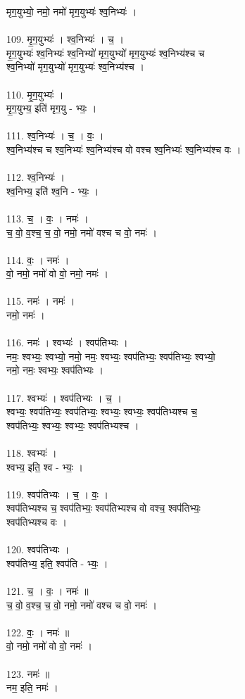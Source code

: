 मृग॒युभ्यो॒ नमो॒ नमो॑ मृग॒युभ्यः॑ श्व॒निभ्यः॑ ।\\
\\
109. मृ॒ग॒युभ्यः॑ । श्व॒निभ्यः॑ । च॒ ।\\
मृ॒ग॒युभ्यः॑ श्व॒निभ्यः॑ श्व॒निभ्यो॑ मृग॒युभ्यो॑ मृग॒युभ्यः॑ श्व॒निभ्य॑श्च च\\
श्व॒निभ्यो॑ मृग॒युभ्यो॑ मृग॒युभ्यः॑ श्व॒निभ्य॑श्च ।\\
\\
110. मृ॒ग॒युभ्यः॑ ।\\
मृ॒ग॒युभ्य॒ इति॑ मृग॒यु - भ्यः॒ ।\\
\\
111. श्व॒निभ्यः॑ । च॒ । वः॒ ।\\
श्व॒निभ्य॑श्च च श्व॒निभ्यः॑ श्व॒निभ्य॑श्च वो वश्च श्व॒निभ्यः॑ श्व॒निभ्य॑श्च वः ।\\
\\
112. श्व॒निभ्यः॑ ।\\
श्व॒निभ्य॒ इति॑ श्व॒नि - भ्यः॒ ।\\
\\
113. च॒ । वः॒ । नमः॑ ।\\
च॒ वो॒ व॒श्च॒ च॒ वो॒ नमो॒ नमो॑ वश्च च वो॒ नमः॑ ।\\
\\
114. वः॒ । नमः॑ ।\\
वो॒ नमो॒ नमो॑ वो वो॒ नमो॒ नमः॑ ।\\
\\
115. नमः॑ । नमः॑ ।\\
नमो॒ नमः॑ ।\\
\\
116. नमः॑ । श्वभ्यः॑ । श्वप॑तिभ्यः ।\\
नमः॒ श्वभ्यः॒ श्वभ्यो॒ नमो॒ नमः॒ श्वभ्यः॒ श्वप॑तिभ्यः॒ श्वप॑तिभ्यः॒ श्वभ्यो॒\\
नमो॒ नमः॒ श्वभ्यः॒ श्वप॑तिभ्यः ।\\
\\
117. श्वभ्यः॑ । श्वप॑तिभ्यः । च॒ ।\\
श्वभ्यः॒ श्वप॑तिभ्यः॒ श्वप॑तिभ्यः॒ श्वभ्यः॒ श्वभ्यः॒ श्वप॑तिभ्यश्च च॒\\
श्वप॑तिभ्यः॒ श्वभ्यः॒ श्वभ्यः॒ श्वप॑तिभ्यश्च ।\\
\\
118. श्वभ्यः॑ ।\\
श्वभ्य॒ इति॒ श्व - भ्यः॒ ।\\
\\
119. श्वप॑तिभ्यः । च॒ । वः॒ ।\\
श्वप॑तिभ्यश्च च॒ श्वप॑तिभ्यः॒ श्वप॑तिभ्यश्च वो वश्च॒ श्वप॑तिभ्यः॒\\
श्वप॑तिभ्यश्च वः ।\\
\\
120. श्वप॑तिभ्यः ।\\
श्वप॑तिभ्य॒ इति॒ श्वप॑ति - भ्यः॒ ।\\
\\
121. च॒ । वः॒ । नमः॑ ॥\\
च॒ वो॒ व॒श्च॒ च॒ वो॒ नमो॒ नमो॑ वश्च च वो॒ नमः॑ ।\\
\\
122. वः॒ । नमः॑ ॥\\
वो॒ नमो॒ नमो॑ वो वो॒ नमः॑ ।\\
\\
123. नमः॑ ॥\\
नम॒ इति॒ नमः॑ ।\\
